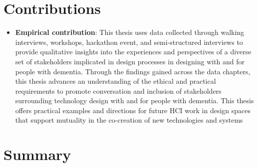 \section{Contributions}
\label{Intro:Contribution}

\begin{itemize}
    \item \textbf{Empirical contribution}: This thesis uses data collected through walking interviews, workshops, hackathon event, and semi-structured interviews to provide qualitative insights into the experiences and perspectives of a diverse set of stakeholders implicated in design processes in designing with and for people with dementia. Through the findings gained across the data chapters, this thesis advances an understanding of the ethical and practical requirements to promote conversation and inclusion of stakeholders surrounding technology design with and for people with dementia. This thesis offers practical examples and directions for future HCI work in design spaces that support mutuality in the co-creation of new technologies and systems

\end{itemize}


\section{Summary}
\label{Intro: Summary}